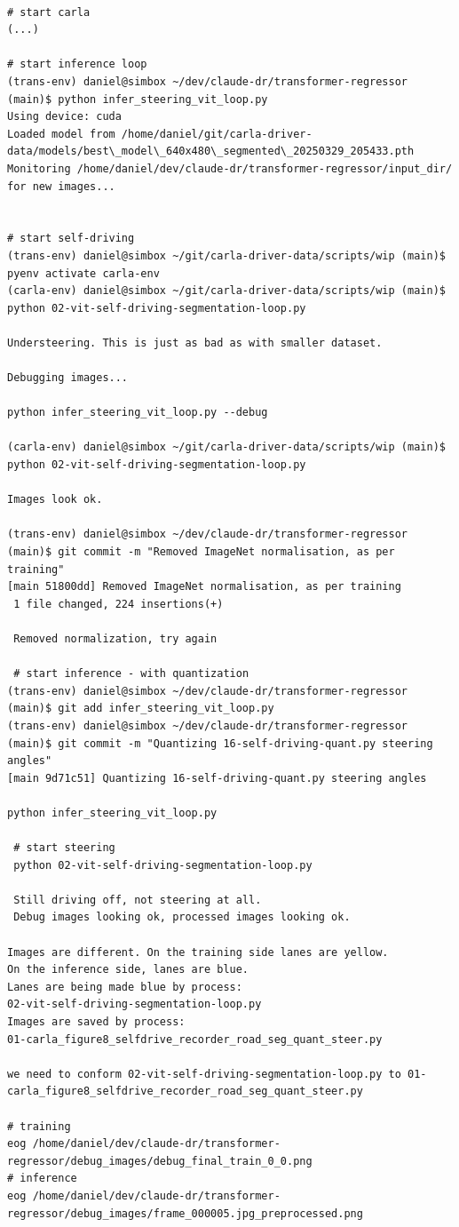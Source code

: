 \begin{verbatim}

# start carla
(...)

# start inference loop
(trans-env) daniel@simbox ~/dev/claude-dr/transformer-regressor (main)$ python infer_steering_vit_loop.py 
Using device: cuda
Loaded model from /home/daniel/git/carla-driver-data/models/best\_model\_640x480\_segmented\_20250329_205433.pth
Monitoring /home/daniel/dev/claude-dr/transformer-regressor/input_dir/ for new images...


# start self-driving
(trans-env) daniel@simbox ~/git/carla-driver-data/scripts/wip (main)$ pyenv activate carla-env
(carla-env) daniel@simbox ~/git/carla-driver-data/scripts/wip (main)$ python 02-vit-self-driving-segmentation-loop.py 

Understeering. This is just as bad as with smaller dataset.

Debugging images...

python infer_steering_vit_loop.py --debug

(carla-env) daniel@simbox ~/git/carla-driver-data/scripts/wip (main)$ python 02-vit-self-driving-segmentation-loop.py

Images look ok.

(trans-env) daniel@simbox ~/dev/claude-dr/transformer-regressor (main)$ git commit -m "Removed ImageNet normalisation, as per training"
[main 51800dd] Removed ImageNet normalisation, as per training
 1 file changed, 224 insertions(+)

 Removed normalization, try again

 # start inference - with quantization
(trans-env) daniel@simbox ~/dev/claude-dr/transformer-regressor (main)$ git add infer_steering_vit_loop.py 
(trans-env) daniel@simbox ~/dev/claude-dr/transformer-regressor (main)$ git commit -m "Quantizing 16-self-driving-quant.py steering angles"
[main 9d71c51] Quantizing 16-self-driving-quant.py steering angles

python infer_steering_vit_loop.py

 # start steering
 python 02-vit-self-driving-segmentation-loop.py 

 Still driving off, not steering at all. 
 Debug images looking ok, processed images looking ok.

Images are different. On the training side lanes are yellow. 
On the inference side, lanes are blue.
Lanes are being made blue by process:
02-vit-self-driving-segmentation-loop.py
Images are saved by process:
01-carla_figure8_selfdrive_recorder_road_seg_quant_steer.py

we need to conform 02-vit-self-driving-segmentation-loop.py to 01-carla_figure8_selfdrive_recorder_road_seg_quant_steer.py

# training
eog /home/daniel/dev/claude-dr/transformer-regressor/debug_images/debug_final_train_0_0.png
# inference
eog /home/daniel/dev/claude-dr/transformer-regressor/debug_images/frame_000005.jpg_preprocessed.png
\end{verbatim}

